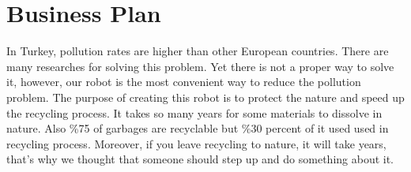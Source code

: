 \documentclass[12pt,a4paper]{article}
\begin{document}
 \section{Business Plan}
 \begin{flushleft}
  In Turkey, pollution rates are higher than other European countries. There are many researches for solving 
  this problem. Yet there is not a proper way to solve it, however, our robot is the most convenient 
  way to reduce the pollution problem. The purpose of creating this robot is to protect the nature and 
  speed up the recycling process. It takes so many years for some materials to dissolve in nature. Also \%75 of 
  garbages are recyclable but \%30 percent of it used used in recycling process. Moreover, if you leave recycling to nature, 
  it will take years, that's why we thought that someone should step up and do something about it.
 \end{flushleft}
\end{document}
